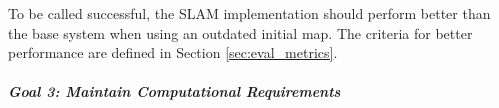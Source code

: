 To be called successful, the SLAM implementation should perform better than the base system when using an outdated initial map. The criteria for better performance are defined in Section \ref{sec:eval_metrics}.

\subparagraph{Goal 3: Maintain Computational Requirements}









